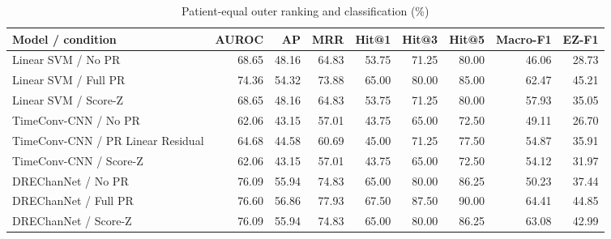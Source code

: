 \begin{table}[t]
\centering
\caption{Patient-equal outer ranking and classification (\%)}
\small
\begin{tabular}{lrrrrrrrr}
\toprule
Model / condition & AUROC & AP & MRR & Hit@1 & Hit@3 & Hit@5 & Macro-F1 & EZ-F1 \\
\midrule
Linear SVM / No PR & 68.65 & 48.16 & 64.83 & 53.75 & 71.25 & 80.00 & 46.06 & 28.73 \\
Linear SVM / Full PR & 74.36 & 54.32 & 73.88 & 65.00 & 80.00 & 85.00 & 62.47 & 45.21 \\
Linear SVM / Score-Z & 68.65 & 48.16 & 64.83 & 53.75 & 71.25 & 80.00 & 57.93 & 35.05 \\
TimeConv-CNN / No PR & 62.06 & 43.15 & 57.01 & 43.75 & 65.00 & 72.50 & 49.11 & 26.70 \\
TimeConv-CNN / PR Linear Residual & 64.68 & 44.58 & 60.69 & 45.00 & 71.25 & 77.50 & 54.87 & 35.91 \\
TimeConv-CNN / Score-Z & 62.06 & 43.15 & 57.01 & 43.75 & 65.00 & 72.50 & 54.12 & 31.97 \\
DREChanNet / No PR & 76.09 & 55.94 & 74.83 & 65.00 & 80.00 & 86.25 & 50.23 & 37.44 \\
DREChanNet / Full PR & 76.60 & 56.86 & 77.93 & 67.50 & 87.50 & 90.00 & 64.41 & 44.85 \\
DREChanNet / Score-Z & 76.09 & 55.94 & 74.83 & 65.00 & 80.00 & 86.25 & 63.08 & 42.99 \\
\bottomrule
\end{tabular}
\end{table}
